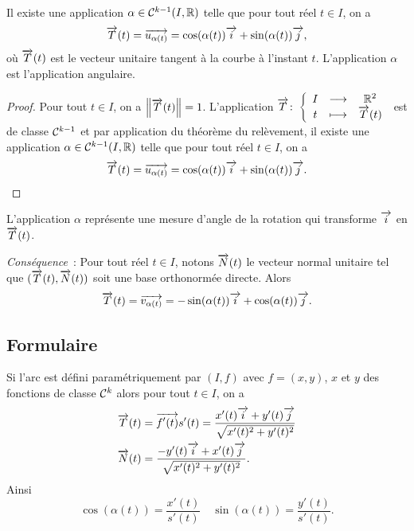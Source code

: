 \begin{prop}
  Il existe une application \(\alpha \in \mathcal{C}^{k-1}(I, \mathbb{R})\) telle que pour tout réel \(t \in I\), on a
  \begin{equation}
    \overrightarrow{T}(t) = \overrightarrow{u_{\alpha(t)}} = \cos(\alpha(t)) \overrightarrow{i} + \sin(\alpha(t)) \overrightarrow{j},
  \end{equation}
  où \(\overrightarrow{T}(t)\) est le vecteur unitaire tangent à la courbe à l'instant \(t\). L'application \(\alpha\) est l'application angulaire.
\end{prop}
\begin{proof}
  Pour tout \(t \in I\), on a \(\left\lVert\overrightarrow{T}(t)\right\rVert=1\). L'application \(\overrightarrow{T}\colon \left\{\begin{array}{ccc} I & \longrightarrow &\mathbb{R}^2\\ t & \longmapsto & \overrightarrow{T}(t) \end{array} \right.\) est de classe \(\mathcal{C}^{k-1}\) et par application du théorème du relèvement, il existe une application \(\alpha \in \mathcal{C}^{k-1}(I, \mathbb{R})\) telle que pour tout réel \(t \in I\), on a
  \begin{equation}
    \overrightarrow{T}(t) = \overrightarrow{u_{\alpha(t)}} = \cos(\alpha(t)) \overrightarrow{i} + \sin(\alpha(t)) \overrightarrow{j}.
  \end{equation}
\end{proof}

L'application \(\alpha\) représente une mesure d'angle de la rotation qui transforme \(\overrightarrow{i}\) en \(\overrightarrow{T}(t)\).

\emph{Conséquence}~: Pour tout réel \(t \in I\), notons \(\overrightarrow{N}(t)\) le vecteur normal unitaire tel que \((\overrightarrow{T}(t), \overrightarrow{N}(t))\) soit une base orthonormée directe. Alors 
\begin{equation}
  \overrightarrow{T}(t) = \overrightarrow{v_{\alpha(t)}} = -\sin(\alpha(t)) \overrightarrow{i} + \cos(\alpha(t)) \overrightarrow{j}.
\end{equation}

\subsection{Formulaire}

Si l'arc est défini paramétriquement par \((I,f)\) avec \(f=(x,y)\), \(x\) et \(y\) des fonctions de classe \(\mathcal{C}^{k}\) alors pour tout \(t \in I\), on a
\begin{align}
  \overrightarrow{T}(t) &= \overrightarrow{f'(t)}{s'(t)} = \frac{x'(t)\overrightarrow{i}+y'(t)\overrightarrow{j}}{\sqrt{x'(t)^2+y'(t)^2}} \\
  \overrightarrow{N}(t) &= \frac{-y'(t)\overrightarrow{i}+x'(t)\overrightarrow{j}}{\sqrt{x'(t)^2+y'(t)^2}}.
\end{align}
Ainsi
\begin{equation}
  \cos(\alpha(t)) = \frac{x'(t)}{s'(t)} \quad \sin(\alpha(t)) = \frac{y'(t)}{s'(t)}.
\end{equation}

